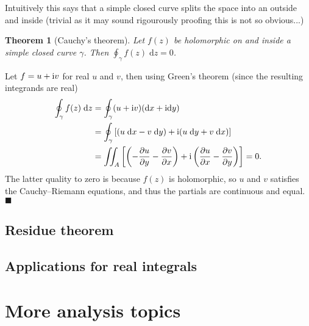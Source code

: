 \documentclass[letter-paper]{tufte-book}
\newtheorem{theorem}{\color{pastel-blue}Theorem}[section]
\newenvironment{proof}[1][Proof]{\begin{trivlist}
\item[\hskip \labelsep {\bfseries #1}]}{\end{trivlist}}
\newenvironment{example}[1][Example]{\begin{trivlist}
\item[\hskip \labelsep {\bfseries #1}]}{\end{trivlist}}
\newcommand{\dy}{\partial}
\newcommand{\ddy}[2]{\frac{\dy#1}{\dy#2}}
\newcommand{\zi}{{\rm i}}
\newcommand{\qed}{\hfill$\blacksquare$}
\begin{document}
Intuitively this says that a simple closed curve splits the space into an
outside and inside (trivial as it may sound rigourously proofing this is not so
obvious...)

\begin{theorem}[Cauchy's theorem]
  Let $f(z)$ be holomorphic on and inside a simple closed curve $\gamma$. Then
  $\oint_\gamma f(z)\; \mathrm{d}z = 0$.
\end{theorem}

\begin{proof}
  Let $f = u + \zi v$ for real $u$ and $v$, then using Green's theorem (since
  the resulting integrands are real)
  \begin{align*}
    \oint_\gamma f(z)\; \mathrm{d}z &= \oint_\gamma (u + \zi v)(\mathrm{d}x + \zi \mathrm{d}y) \\
      &= \oint_\gamma \left[(u\; \mathrm{d}x - v\; \mathrm{d}y) + \zi(u\; \mathrm{d}y + v\; \mathrm{d}x) \right]\\
      &= \iint_A \left[\left(-\ddy{u}{y} -\ddy{v}{x}\right) + \zi \left(\ddy{u}{x} - \ddy{v}{y}\right)\right] = 0.
  \end{align*}
  The latter quality to zero is because $f(z)$ is holomorphic, so $u$ and $v$
  satisfies the Cauchy--Riemann equations, and thus the partials are continuous
  and equal. \qed
\end{proof}

\begin{example}

\end{example}

\section{Residue theorem}


\section{Applications for real integrals}


\chapter{More analysis topics}
\end{document}
